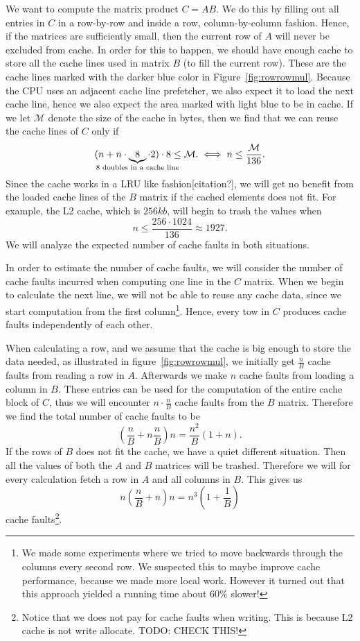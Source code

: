 We want to compute the matrix product $C = AB$. We do this by filling
out all entries in $C$ in a row-by-row and inside a row,
column-by-column fashion. Hence, if the matrices are sufficiently
small, then the current row of $A$ will never be excluded from
cache. In order for this to happen, we should have enough cache to
store all the cache lines used in matrix $B$ (to fill the current
row). These are the cache lines marked with the darker blue color in
Figure~\ref{fig:rowrowmul}. Because the CPU uses an adjacent cache
line prefetcher, we also expect it to load the next cache line, hence
we also expect the area marked with light blue to be in cache. If we
let $\mathcal{M}$ denote the size of the cache in bytes, then we find
that we can reuse the cache lines of $C$ only if
\[
( n + n \cdot \underbrace{8}_{\mathclap{8 \text{ doubles in a cache line}}} \cdot 2) \cdot 8 \leq \mathcal{M}.
\iff
n \leq \frac{\mathcal{M}}{136}.
\]
Since the cache works in a LRU like fashion[citation?], we will get no
benefit from the loaded cache lines of the $B$ matrix if the cached
elements does not fit. For example, the L2 cache, which is $256kb$,
will begin to trash the values when
\[
n \leq \frac{256 \cdot 1024}{136} \approx 1927.
\]
We will analyze the expected number of cache faults in both situations.

In order to estimate the number of cache faults, we will consider the
number of cache faults incurred when computing one line in the $C$
matrix. When we begin to calculate the next line, we will not be able
to reuse any cache data, since we start computation from the first
column\footnote{We made some experiments where we tried to move
  backwards through the columns every second row. We suspected this to
  maybe improve cache performance, because we made more local
  work. However it turned out that this approach yielded a running
  time about $60\%$ slower!}. Hence, every tow in $C$ produces cache
faults independently of each other.

When calculating a row, and we assume that the cache is big enough to
store the data needed, as illustrated in figure~\ref{fig:rowrowmul},
we initially get $\frac{n}{B}$ cache faults from reading a row in $A$.
Afterwards we make $n$ cache faults from loading a column in
$B$. These entries can be used for the computation of the entire cache
block of $C$, thus we will encounter $n \cdot \frac{n}{B}$ cache
faults from the $B$ matrix. Therefore we find the total number of
cache faults to be
\[
\left( \frac{n}{B} + n \frac{n}{B} \right) n = \frac{n^2}{B} \left( 1 + n \right).
\]
If the rows of $B$ does not fit the cache, we have a quiet different
situation. Then all the values of both the $A$ and $B$ matrices will
be trashed. Therefore we will for every calculation fetch a row in $A$
and all columns in $B$. This gives us
\[
n\left( \frac{n}{B} + n \right) n = n^3 \left(1 + \frac{1}{B} \right)
\]
cache faults\footnote{Notice that we does not pay for cache faults
  when writing. This is because L2 cache is not write
  allocate. TODO: CHECK THIS!}.

